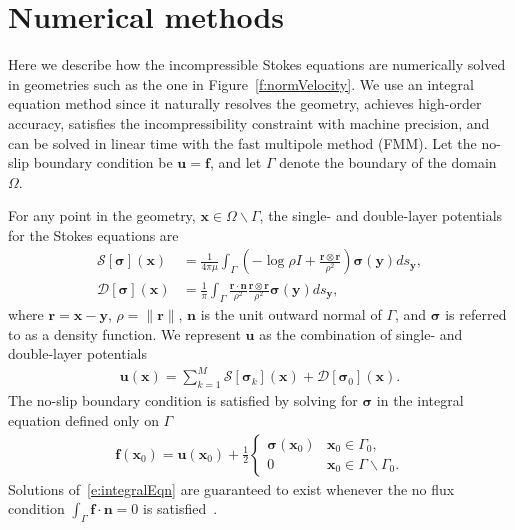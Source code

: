 \documentclass[onecolumn,showpacs,pre,preprintnumbers,floatfix]{revtex4-1}
\newcommand{\DD}{\mathcal{D}}
\newcommand{\ff}{\mathbf{f}}
\newcommand{\nn}{\mathbf{n}}
\newcommand{\rr}{\mathbf{r}}
\renewcommand{\SS}{\mathcal{S}}
\newcommand{\ssigma}{\boldsymbol{\sigma}}
\newcommand{\uu}{\mathbf{u}}
\newcommand{\xx}{\mathbf{x}}
\newcommand{\yy}{\mathbf{y}}
\begin{document}
\section{Numerical methods}
Here we describe how the incompressible Stokes equations are
numerically solved in geometries such as the one in
Figure~\ref{f:normVelocity}.  We use an integral equation method since
it naturally resolves the geometry, achieves high-order accuracy,
satisfies the incompressibility constraint with machine precision, and
can be solved in linear time with the fast multipole method (FMM).  Let
the no-slip boundary condition be $\uu = \ff$, and let $\Gamma$ denote
the boundary of the domain $\Omega$.

For any point in the geometry, $\xx \in \Omega \backslash \Gamma$, the
single- and double-layer potentials for the Stokes equations
are~\cite{poz1992}
\begin{align*}
  \SS[\ssigma](\xx) &= \frac{1}{4\pi\mu}\int_{\Gamma} \left(
  -\log\rho I + \frac{\rr \otimes\rr}{\rho^{2}} 
  \right)\ssigma(\yy)ds_{\yy},  \\
  \DD[\ssigma](\xx) &= \frac{1}{\pi}\int_{\Gamma} 
  \frac{\rr \cdot \nn}{\rho^{2}}\frac{\rr \otimes \rr}{\rho^{2}}
  \ssigma(\yy)ds_{\yy},
\end{align*}
where $\rr = \xx - \yy$, $\rho = \|\rr\|$, $\nn$ is the unit outward
normal of $\Gamma$, and $\ssigma$ is referred to as a density
function.  We represent $\uu$ as the combination of single- and
double-layer potentials
\begin{align}
  \uu(\xx) = \sum_{k=1}^{M} \SS[\ssigma_{k}](\xx) + 
    \DD[\ssigma_{0}](\xx).
  \label{e:integralRep}
\end{align}
The no-slip boundary condition is satisfied by solving for $\ssigma$ in
the integral equation defined only on $\Gamma$
\begin{align}
  \ff(\xx_{0}) = \uu(\xx_{0}) + \frac{1}{2}\left\{
    \begin{array}{cl}
      \ssigma(\xx_{0}) & \xx_{0} \in \Gamma_{0}, \\
      0 & \xx_{0} \in \Gamma \backslash \Gamma_{0}.
    \end{array}
    \right. 
    \label{e:integralEqn}
\end{align}
Solutions of~\eqref{e:integralEqn} are guaranteed to exist whenever the
no flux condition $\int_{\Gamma} \ff \cdot \nn=0$ is
satisfied~\cite{poz1992}.
\end{document}
